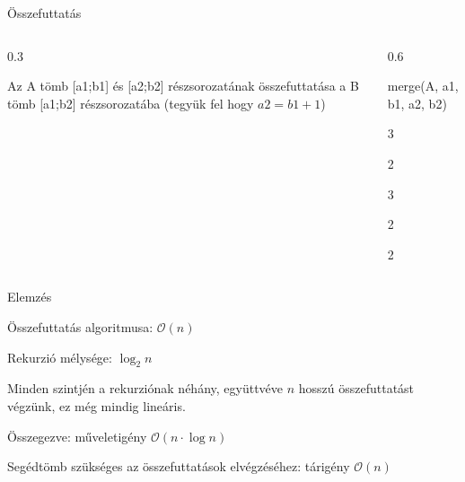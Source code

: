 \documentclass[hungarian]{beamer}
\newcommand{\Ord}{\mathcal{O}}
\begin{document}
\begin{frame}{Összefuttatás}

\begin{columns}

\begin{column}{0.3\linewidth}

Az A tömb [a1;b1] és [a2;b2] részsorozatának összefuttatása a B tömb [a1;b2] részsorozatába (tegyük fel hogy $a2 = b1 + 1$)

\end{column}

\begin{column}{0.6\linewidth}

\begin{stukibox*}{merge(A, a1, b1, a2, b2)}
\begin{WHILE}{3}{}
    \begin{IF}{2}{}
    \ELSE
    \end{IF}
\end{WHILE}
\begin{IF}{3}{}
    \begin{WHILE}{2}{}
    \end{WHILE}
\ELSE
    \begin{WHILE}{2}{}
    \end{WHILE}
\end{IF}
\end{stukibox*}

\end{column}

\end{columns}
    
\end{frame}

\begin{frame}{Elemzés}

Összefuttatás algoritmusa: $\Ord(n)$

Rekurzió mélysége: $\log_2 n$

Minden szintjén a rekurziónak néhány, együttvéve $n$ hosszú összefuttatást végzünk, ez még mindig lineáris.

Összegezve: műveletigény $\Ord(n \cdot \log n)$

Segédtömb szükséges az összefuttatások elvégzéséhez: tárigény $\Ord(n)$

\end{frame}
\end{document}
